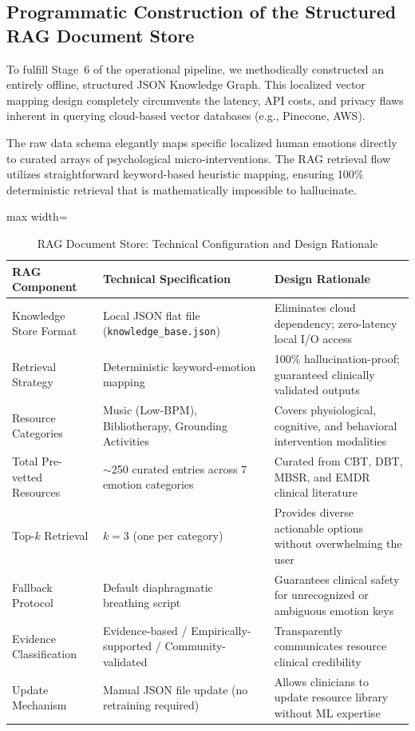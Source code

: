 \documentclass[12pt,twoside]{article}
\begin{document}
\subsection{Programmatic Construction of the Structured RAG Document Store}

To fulfill Stage~6 of the operational pipeline, we methodically constructed an entirely offline, structured JSON Knowledge Graph. This localized vector mapping design completely circumvents the latency, API costs, and privacy flaws inherent in querying cloud-based vector databases (e.g., Pinecone, AWS).

The raw data schema elegantly maps specific localized human emotions directly to curated arrays of psychological micro-interventions. The RAG retrieval flow utilizes straightforward keyword-based heuristic mapping, ensuring 100\% deterministic retrieval that is mathematically impossible to hallucinate.

\begin{table}[htbp]
\centering
\Large
\renewcommand{\arraystretch}{2.4}
\setlength{\tabcolsep}{12pt}
\begin{adjustbox}{max width=\textwidth}
\begin{tabular}{|p{5.0cm}|p{5.0cm}|p{9.5cm}|}
\hline
\rowcolor{gray!20}
\textbf{RAG Component} & \textbf{Technical Specification} & \textbf{Design Rationale} \\
\hline
Knowledge Store Format & Local JSON flat file (\texttt{knowledge\_base.json}) & Eliminates cloud dependency; zero-latency local I/O access \\
\hline
Retrieval Strategy & Deterministic keyword-emotion mapping & 100\% hallucination-proof; guaranteed clinically validated outputs \\
\hline
Resource Categories & Music (Low-BPM), Bibliotherapy, Grounding Activities & Covers physiological, cognitive, and behavioral intervention modalities \\
\hline
Total Pre-vetted Resources & $\sim$250 curated entries across 7 emotion categories & Curated from CBT, DBT, MBSR, and EMDR clinical literature \\
\hline
Top-$k$ Retrieval & $k = 3$ (one per category) & Provides diverse actionable options without overwhelming the user \\
\hline
Fallback Protocol & Default diaphragmatic breathing script & Guarantees clinical safety for unrecognized or ambiguous emotion keys \\
\hline
Evidence Classification & Evidence-based / Empirically-supported / Community-validated & Transparently communicates resource clinical credibility \\
\hline
Update Mechanism & Manual JSON file update (no retraining required) & Allows clinicians to update resource library without ML expertise \\
\hline
\end{tabular}
\end{adjustbox}
\caption{RAG Document Store: Technical Configuration and Design Rationale}
\label{tab:rag_config}
\end{table}
\end{document}
